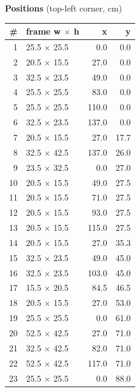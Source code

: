 \documentclass[a4paper,landscape,10pt]{article}
\begin{document}
\begin{minipage}[t]{0.25\textwidth}
\vspace{8pt}
{\bfseries Positions} (top-left corner, cm)\\[2pt]
\tiny
\begin{tabular}{@{}r l r r@{}}
\toprule
\# & frame w $\times$ h & x & y \\
\midrule
1 & 25.5 $\times$ 25.5 & 0.0 & 0.0 \\
2 & 20.5 $\times$ 15.5 & 27.0 & 0.0 \\
3 & 32.5 $\times$ 23.5 & 49.0 & 0.0 \\
4 & 25.5 $\times$ 25.5 & 83.0 & 0.0 \\
5 & 25.5 $\times$ 25.5 & 110.0 & 0.0 \\
6 & 32.5 $\times$ 23.5 & 137.0 & 0.0 \\
7 & 20.5 $\times$ 15.5 & 27.0 & 17.7 \\
8 & 32.5 $\times$ 42.5 & 137.0 & 26.0 \\
9 & 23.5 $\times$ 32.5 & 0.0 & 27.0 \\
10 & 20.5 $\times$ 15.5 & 49.0 & 27.5 \\
11 & 20.5 $\times$ 15.5 & 71.0 & 27.5 \\
12 & 20.5 $\times$ 15.5 & 93.0 & 27.5 \\
13 & 20.5 $\times$ 15.5 & 115.0 & 27.5 \\
14 & 20.5 $\times$ 15.5 & 27.0 & 35.3 \\
15 & 32.5 $\times$ 23.5 & 49.0 & 45.0 \\
16 & 32.5 $\times$ 23.5 & 103.0 & 45.0 \\
17 & 15.5 $\times$ 20.5 & 84.5 & 46.5 \\
18 & 20.5 $\times$ 15.5 & 27.0 & 53.0 \\
19 & 25.5 $\times$ 25.5 & 0.0 & 61.0 \\
20 & 52.5 $\times$ 42.5 & 27.0 & 71.0 \\
21 & 32.5 $\times$ 42.5 & 82.0 & 71.0 \\
22 & 52.5 $\times$ 42.5 & 117.0 & 71.0 \\
23 & 25.5 $\times$ 25.5 & 0.0 & 88.0 \\
\bottomrule
\end{tabular}
\end{minipage}
\clearpage
\end{document}
